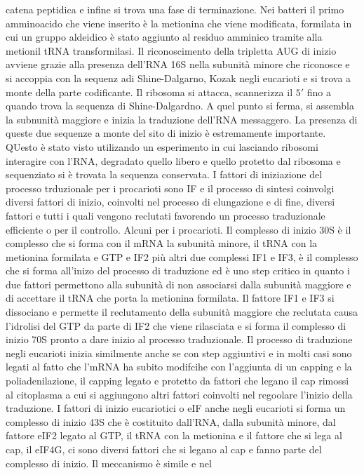catena peptidica e infine si trova una fase di terminazione. Nei batteri il primo amminoacido che viene inserito \`e la metionina che viene modificata, formilata in cui un gruppo 
aldeidico \`e stato aggiunto al residuo amminico tramite alla metionil tRNA transformilasi. Il riconoscimento della tripletta AUG di inizio avviene grazie alla presenza dell'RNA 16S nella
subunit\`a minore che riconosce e si accoppia con la sequenz adi Shine-Dalgarno, Kozak negli eucarioti e si trova a monte della parte codificante. Il ribosoma si attacca, scannerizza il 
$5'$ fino a quando trova la sequenza di Shine-Dalgardno. A quel punto si ferma, si assembla la subnunit\`a maggiore e inizia la traduzione dell'RNA messaggero. La presenza di queste
due sequenze a monte del sito di inizio \`e estremamente importante. QUesto \`e stato visto utilizando un esperimento in cui lasciando ribosomi interagire con l'RNA, degradato quello
libero e quello protetto dal ribosoma e sequenziato si \`e trovata la sequenza conservata. I fattori di iniziazione del processo trduzionale per i procarioti sono IF e il processo di 
sintesi coinvolgi diversi fattori di inizio, coinvolti nel processo di elungazione e di fine, diversi fattori e tutti i quali vengono reclutati favorendo un processo traduzionale 
efficiente o per il controllo. Alcuni per i procarioti. Il complesso di inizio 30S \`e il complesso che si forma con il mRNA la subunit\`a minore, il tRNA con la metionina formilata
e GTP e IF2 pi\`u altri due complessi IF1 e IF3, \`e il complesso che si forma all'inizo del processo di traduzione ed \`e uno step critico in quanto i due fattori permettono alla
subunit\`a di non associarsi dalla subunit\`a maggiore e di accettare il tRNA che porta la metionina formilata. Il fattore IF1 e IF3 si dissociano e permette il reclutamento della
subunit\`a maggiore che reclutata causa l'idrolisi del GTP da parte di IF2 che viene rilasciata e si forma il complesso di inizio 70S pronto a dare inizio al processo traduzionale. Il 
processo di traduzione negli eucarioti inizia similmente anche se con step aggiuntivi e in molti casi sono legati al fatto che l'mRNA ha subito modifcihe con l'aggiunta di un capping
e la poliadenilazione, il capping legato e protetto da fattori che legano il cap rimossi al citoplasma a cui si aggiungono altri fattori coinvolti nel regoolare l'inizio della traduzione.
I fattori di inizio eucariotici o eIF anche negli eucarioti si forma un complesso di inizio 43S che \`e costituito dall'RNA, dalla subunit\`a minore, dal fattore eIF2 legato al GTP, 
il tRNA con la metionina e il fattore che si lega al cap, il eIF4G, ci sono diversi fattori che si legano al cap e fanno parte del complesso di inizio. Il meccanismo \`e simile e nel
